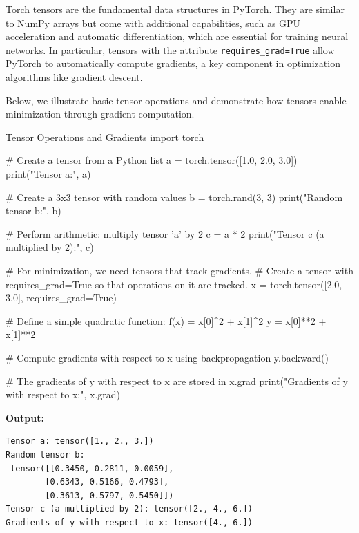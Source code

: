 Torch tensors are the fundamental data structures in PyTorch. They are similar to NumPy arrays but come with additional capabilities, such as GPU acceleration and automatic differentiation, which are essential for training neural networks. In particular, tensors with the attribute \texttt{requires\_grad=True} allow PyTorch to automatically compute gradients, a key component in optimization algorithms like gradient descent.

Below, we illustrate basic tensor operations and demonstrate how tensors enable minimization through gradient computation.

\begin{codeonly}{Tensor Operations and Gradients}
import torch

# Create a tensor from a Python list
a = torch.tensor([1.0, 2.0, 3.0])
print("Tensor a:", a)

# Create a 3x3 tensor with random values
b = torch.rand(3, 3)
print("Random tensor b:\n", b)

# Perform arithmetic: multiply tensor 'a' by 2
c = a * 2
print("Tensor c (a multiplied by 2):", c)

# For minimization, we need tensors that track gradients.
# Create a tensor with requires_grad=True so that operations on it are tracked.
x = torch.tensor([2.0, 3.0], requires_grad=True)

# Define a simple quadratic function: f(x) = x[0]^2 + x[1]^2
y = x[0]**2 + x[1]**2

# Compute gradients with respect to x using backpropagation
y.backward()

# The gradients of y with respect to x are stored in x.grad
print("Gradients of y with respect to x:", x.grad)
\end{codeonly}


\textbf{Output:}
\begin{lstlisting}
Tensor a: tensor([1., 2., 3.])
Random tensor b:
 tensor([[0.3450, 0.2811, 0.0059],
        [0.6343, 0.5166, 0.4793],
        [0.3613, 0.5797, 0.5450]])
Tensor c (a multiplied by 2): tensor([2., 4., 6.])
Gradients of y with respect to x: tensor([4., 6.])
\end{lstlisting}

%

